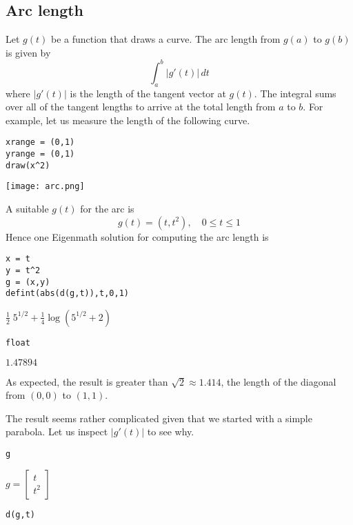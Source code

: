 \subsection{Arc length}

Let $g(t)$ be a function that draws a curve.
The arc length from $g(a)$ to $g(b)$ is given by
$$\int_a^b|g'(t)|\,dt$$
where $|g'(t)|$ is the length of the tangent vector at $g(t)$.
The integral sums over all of the tangent lengths to arrive at the total length
from $a$ to $b$.
For example, let us measure the length of the following curve.

{\color{blue}
\begin{verbatim}
xrange = (0,1)
yrange = (0,1)
draw(x^2)
\end{verbatim}
}

\begin{center}
\texttt{[image: arc.png]}
\end{center}

\noindent
A suitable $g(t)$ for the arc is
$$g(t)=(t,t^2),\quad0\le t\le1$$
Hence one Eigenmath solution for computing the arc length is

\begin{Verbatim}[formatcom=\color{blue},samepage=true]
x = t
y = t^2
g = (x,y)
defint(abs(d(g,t)),t,0,1)
\end{Verbatim}

\noindent
$\displaystyle \tfrac{1}{2}\;5^{1/2}+\tfrac{1}{4}\log(5^{1/2}+2)$

\begin{Verbatim}[formatcom=\color{blue},samepage=true]
float
\end{Verbatim}

\noindent
$\displaystyle 1.47894$

\bigskip
\noindent
As expected, the result is greater than $\sqrt2\approx1.414$,
the length of the
diagonal from $(0,0)$ to $(1,1)$.

\bigskip
\noindent
The result seems rather complicated given that we
started with a simple parabola.
Let us inspect $|g'(t)|$ to see why.

\begin{Verbatim}[formatcom=\color{blue},samepage=true]
g
\end{Verbatim}

\noindent
$\displaystyle g=\begin{bmatrix}t\\ t^2\end{bmatrix}$

\begin{Verbatim}[formatcom=\color{blue},samepage=true]
d(g,t)
\end{Verbatim}

